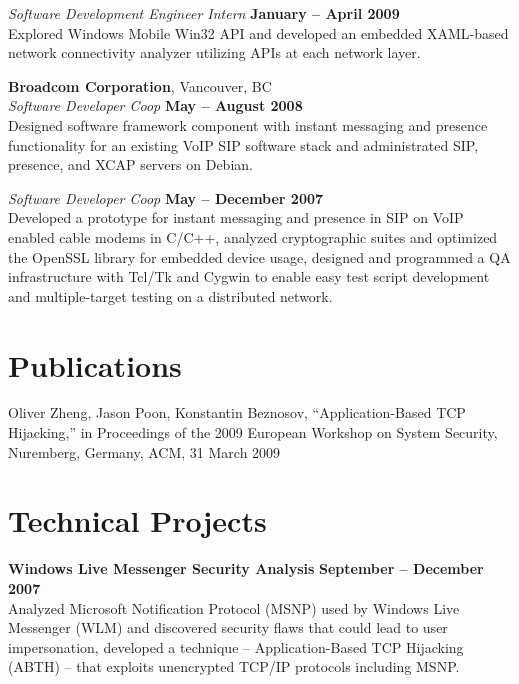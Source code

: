 \documentclass[margin,line]{resume}
\begin{document}
\begin{resume}
	\textsl{Software Development Engineer Intern} \hfill
	\textbf{January -- April 2009}\\
	Explored Windows Mobile Win32 API and developed an embedded XAML-based
	network connectivity analyzer utilizing APIs at each network layer.

	\textbf{Broadcom Corporation}, Vancouver, BC \vspace{2mm}\\\vspace{1mm}%
	\textsl{Software Developer Coop} \hfill
	\textbf{May -- August 2008}\\
	Designed software framework component with instant messaging and presence
	functionality for an existing VoIP SIP software stack and administrated SIP,
	presence, and XCAP servers on Debian.

	\textsl{Software Developer Coop} \hfill
	\textbf{May -- December 2007}\\
	Developed a prototype for instant messaging and presence in SIP on VoIP
	enabled cable modems in C/C++, analyzed cryptographic suites and
	optimized the OpenSSL library for embedded device usage, designed and
	programmed a QA infrastructure with Tcl/Tk and Cygwin to enable easy test
	script development and multiple-target testing on a distributed network.

	\section{\mysidestyle Publications}

	Oliver Zheng, Jason Poon, Konstantin Beznosov, ``Application-Based TCP
	Hijacking,'' in Proceedings of the 2009 European Workshop on System
	Security, Nuremberg, Germany, ACM, 31 March 2009

	\section{\mysidestyle Technical Projects}

	\textbf{Windows Live Messenger Security Analysis} \hfill
	\textbf{September -- December 2007} \vspace{2mm}\\\vspace{1mm}%
	Analyzed Microsoft Notification Protocol (MSNP) used by Windows Live
	Messenger (WLM) and discovered security flaws that could lead to user
	impersonation, developed a technique -- Application-Based TCP Hijacking
	(ABTH) -- that exploits unencrypted TCP/IP protocols including MSNP.


\end{resume}
\end{document}
